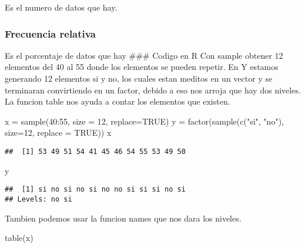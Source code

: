 \documentclass[
]{article}
\newenvironment{Shaded}{\begin{snugshade}}{\end{snugshade}}
\newcommand{\AttributeTok}[1]{\textcolor[rgb]{0.77,0.63,0.00}{#1}}
\newcommand{\ConstantTok}[1]{\textcolor[rgb]{0.00,0.00,0.00}{#1}}
\newcommand{\DecValTok}[1]{\textcolor[rgb]{0.00,0.00,0.81}{#1}}
\newcommand{\FunctionTok}[1]{\textcolor[rgb]{0.00,0.00,0.00}{#1}}
\newcommand{\NormalTok}[1]{#1}
\newcommand{\OtherTok}[1]{\textcolor[rgb]{0.56,0.35,0.01}{#1}}
\newcommand{\SpecialCharTok}[1]{\textcolor[rgb]{0.00,0.00,0.00}{#1}}
\newcommand{\StringTok}[1]{\textcolor[rgb]{0.31,0.60,0.02}{#1}}
\begin{document}
Es el numero de datos que hay.

\hypertarget{frecuencia-relativa}{%
\subsubsection{Frecuencia relativa}\label{frecuencia-relativa}}

Es el porcentaje de datos que hay \#\#\# Codigo en R Con sample obtener
12 elementos del 40 al 55 donde los elementos se pueden repetir. En Y
estamos generando 12 elementos si y no, los cuales estan meditos en un
vector y se terminaran convirtiendo en un factor, debido a eso nos
arroja que hay dos niveles. La funcion table nos ayuda a contar los
elementos que existen.

\begin{Shaded}
\begin{Highlighting}[]
\NormalTok{x }\OtherTok{=} \FunctionTok{sample}\NormalTok{(}\DecValTok{40}\SpecialCharTok{:}\DecValTok{55}\NormalTok{, }\AttributeTok{size =} \DecValTok{12}\NormalTok{, }\AttributeTok{replace=}\ConstantTok{TRUE}\NormalTok{)}
\NormalTok{y }\OtherTok{=} \FunctionTok{factor}\NormalTok{(}\FunctionTok{sample}\NormalTok{(}\FunctionTok{c}\NormalTok{(}\StringTok{"si"}\NormalTok{, }\StringTok{"no"}\NormalTok{), }\AttributeTok{size=}\DecValTok{12}\NormalTok{, }\AttributeTok{replace =} \ConstantTok{TRUE}\NormalTok{))}
\NormalTok{x}
\end{Highlighting}
\end{Shaded}

\begin{verbatim}
##  [1] 53 49 51 54 41 45 46 54 55 53 49 50
\end{verbatim}

\begin{Shaded}
\begin{Highlighting}[]
\NormalTok{y}
\end{Highlighting}
\end{Shaded}

\begin{verbatim}
##  [1] si no si no si no no si si si no si
## Levels: no si
\end{verbatim}

Tambien podemos usar la funcion names que nos dara los niveles.

\begin{Shaded}
\begin{Highlighting}[]
\FunctionTok{table}\NormalTok{(x)}
\end{Highlighting}
\end{Shaded}
\end{document}

